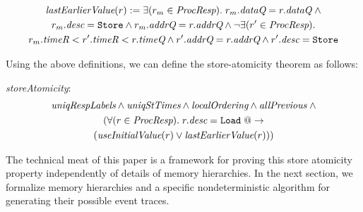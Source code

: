 \vspace{-.3in}

\begin{defn}
\small
\begin{multline*}
\textit{lastEarlierValue}(r) := \exists (r_m \in \textit{ProcResp}). \; r_m.\textit{dataQ} = r.\textit{dataQ} \; \wedge 
\\ r_m.\textit{desc} = \texttt{Store} \wedge r_m.\textit{addrQ} = r.\textit{addrQ} \wedge
\neg \exists (r' \in \textit{ProcResp}). \\
r_m.\textit{timeR} < r'.\textit{timeR} < r.\textit{timeQ} \wedge r'.\textit{addrQ} = r.\textit{addrQ} \wedge r'.\textit{desc} = \texttt{Store}
\end{multline*}
\label{lastEarlierValue}
\end{defn}

\vspace{-.3in}

Using the above definitions, we can define the store-atomicity theorem as follows:
\begin{thm}\textit{storeAtomicity}:
\small
\begin{multline*}
\textit{uniqRespLabels} \wedge
\textit{uniqStTimes} \wedge \textit{localOrdering} \wedge \textit{allPrevious} \; \wedge \\
(\forall (r \in \textit{ProcResp}). \; r.\textit{desc} = \texttt{Load} \; @-> \\
(\textit{useInitialValue}(r) \vee \textit{lastEarlierValue}(r)))
\end{multline*}
\label{storeAtomicity}
\end{thm}
\vspace{-.3in}

The technical meat of this paper is a framework for proving this store atomicity
property independently of details of memory hierarchies.  In the next section,
we formalize memory hierarchies and a specific nondeterministic algorithm for
generating their possible event traces.

